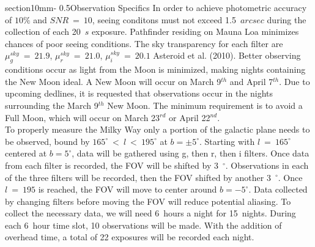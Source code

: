 \documentclass[letterpaper,11pt]{article}
\makeatletter
\renewcommand{\section}{\@startsection%
{section}{1}{0mm}{-\baselineskip}%
{0.5\baselineskip}{\normalfont\Large\bfseries}}%
\makeatother
\begin{document}
\section{Observation Specifics}
In order to achieve photometric accuracy of $10\%$ and $SNR~=~10$, seeing conditons must not exceed 1.5~$arcsec$ during the collection of each 20~$s$ exposure.  Pathfinder residing on Mauna Loa minimizes chances of poor seeing conditions.  The sky transparency for each filter are $\mu^{sky}_{g}~=~21.9$, $\mu^{sky}_{r}~=~21.0$, $\mu^{sky}_{i}~=~20.1$ Asteroid et al. (2010).  Better observing conditions occur as light from the Moon is minimized, making nights containing the New Moon ideal.  A New Moon will occur on March 9$^{th}$ and April 7$^{th}$.  Due to upcoming dedlines, it is requested that observations occur in the nights surrounding the March 9$^{th}$  New Moon.  The minimum requirement is to avoid a Full Moon, which will occur on March 23$^{rd}$ or April 22$^{nd}$.\\


\noindent To properly measure the Milky Way only a portion of the galactic plane needs to be observed, bound by $165^{\circ}~<~l~<~195^{\circ}$ at $b=\pm 5^{\circ}$.  Starting with $l~=~165^{\circ}$ centered at $b=5^{\circ}$, data will be gathered using g, then r, then i filters.  Once data from each filter is recorded, the FOV will be shifted by 3~$^{\circ}$.  Observations in each of the three filters will be recorded, then the FOV shifted by another 3~$^{\circ}$.  Once $l~=~195$ is reached, the FOV will move to center around $b=-5^{\circ}$.  Data collected by changing filters before moving the FOV will reduce potential aliasing.  To collect the necessary data, we will need 6~hours a night for 15~nights.  During each 6~hour time slot, 10 observations will be made.  With the addition of overhead time, a total of 22 exposures will be recorded each night.
\end{document}
